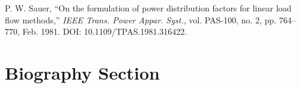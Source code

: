 \documentclass[journal]{IEEEtran}
\begin{document}
\begin{thebibliography}{1}


P. W. Sauer, ``On the formulation of power distribution factors for linear load flow methods,'' \textit{IEEE Trans. Power Appar. Syst.}, vol. PAS-100, no. 2, pp. 764--770, Feb. 1981. DOI: 10.1109/TPAS.1981.316422.









\end{thebibliography}


\newpage

\section{Biography Section}
\end{document}
